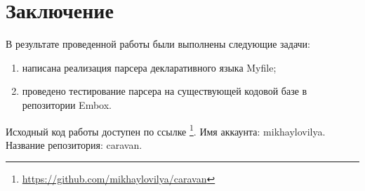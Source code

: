 
\section*{Заключение}




В результате проведенной работы были выполнены следующие задачи:
\begin{enumerate}
	\item написана реализация парсера декларативного языка Myfile;
	\item проведено тестирование парсера на существующей кодовой базе в репозитории Embox.
\end{enumerate}

Исходный код работы доступен по ссылке \footnote{\href{https://github.com/mikhaylovilya/caravan}{https://github.com/mikhaylovilya/caravan}}.
Имя аккаунта: mikhaylovilya. Название репозитория: caravan.
